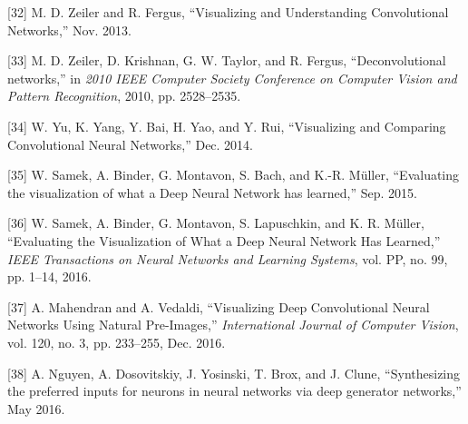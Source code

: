 \documentclass[A4paper,draft]{scrreprt}
\begin{document}
\hypertarget{ref-zeiler2013_VisualizingUnderstandingConvolutional}{}
{[}32{]} M. D. Zeiler and R. Fergus, ``Visualizing and Understanding
Convolutional Networks,'' Nov. 2013.

\hypertarget{ref-zeiler2010_Deconvolutionalnetworks}{}
{[}33{]} M. D. Zeiler, D. Krishnan, G. W. Taylor, and R. Fergus,
``Deconvolutional networks,'' in \emph{2010 IEEE Computer Society
Conference on Computer Vision and Pattern Recognition}, 2010, pp.
2528--2535.

\hypertarget{ref-yu2014_VisualizingComparingConvolutional}{}
{[}34{]} W. Yu, K. Yang, Y. Bai, H. Yao, and Y. Rui, ``Visualizing and
Comparing Convolutional Neural Networks,'' Dec. 2014.

\hypertarget{ref-samek2015_Evaluatingvisualizationwhat}{}
{[}35{]} W. Samek, A. Binder, G. Montavon, S. Bach, and K.-R. Müller,
``Evaluating the visualization of what a Deep Neural Network has
learned,'' Sep. 2015.

\hypertarget{ref-samek2016_EvaluatingVisualizationWhat}{}
{[}36{]} W. Samek, A. Binder, G. Montavon, S. Lapuschkin, and K. R.
Müller, ``Evaluating the Visualization of What a Deep Neural Network Has
Learned,'' \emph{IEEE Transactions on Neural Networks and Learning
Systems}, vol. PP, no. 99, pp. 1--14, 2016.

\hypertarget{ref-mahendran2016_VisualizingDeepConvolutional}{}
{[}37{]} A. Mahendran and A. Vedaldi, ``Visualizing Deep Convolutional
Neural Networks Using Natural Pre-Images,'' \emph{International Journal
of Computer Vision}, vol. 120, no. 3, pp. 233--255, Dec. 2016.

\hypertarget{ref-nguyen2016_Synthesizingpreferredinputs}{}
{[}38{]} A. Nguyen, A. Dosovitskiy, J. Yosinski, T. Brox, and J. Clune,
``Synthesizing the preferred inputs for neurons in neural networks via
deep generator networks,'' May 2016.
\end{document}
